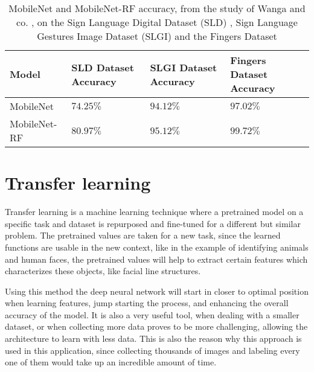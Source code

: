 \begin{table}[htbp]
\begin{center}
\begin{tabular}
{|p{90pt}|p{90pt}|p{90pt}|p{90pt}|}
\hline
Model & SLD Dataset Accuracy & SLGI Dataset Accuracy & Fingers Dataset Accuracy\\
\hline 
\hline MobileNet & $74.25\%$ & $94.12\%$ & $97.02\%$\\
\hline MobileNet-RF & $80.97\%$ & $95.12\%$ & $99.72\%$\\
\hline
\end{tabular}
\end{center}
\caption{MobileNet and MobileNet-RF accuracy, from the study of Wanga and co. \cite{wang2021}, on the Sign Language Digital Dataset (SLD) \cite{kopf:22025:sign-lang:lrec}, Sign Language Gestures Image Dataset (SLGI) \cite{jimaging9120262} and the Fingers Dataset}
\label{MobileNetTable}
\end{table}

\section{Transfer learning}
\label{subsec:preformancesec2}

\par Transfer learning is a machine learning technique where a pretrained model on a specific task and dataset is repurposed and fine-tuned for a different but similar problem. The pretrained values are taken for a new task, since the learned functions are usable in the new context, like in the example of identifying animals and human faces, the pretrained values will help to extract certain features which characterizes these objects, like facial line structures.
\par Using this method the deep neural network will start in closer to optimal position when learning features, jump starting the process, and enhancing the overall accuracy of the model. It is also a very useful tool, when dealing with a smaller dataset, or when collecting more data proves to be more challenging, allowing the architecture to learn with less data. This is also the reason why this approach is used in this application, since collecting thousands of images and labeling every one of them would take up an incredible amount of time.